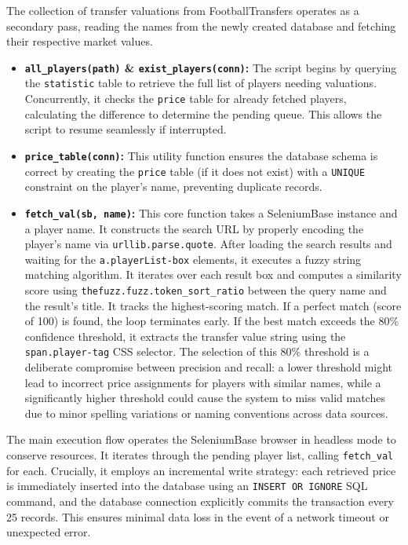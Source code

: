 \documentclass[a4paper,12pt]{report}
\begin{document}
The collection of transfer valuations from FootballTransfers operates as a secondary pass, reading the names from the newly created database and fetching their respective market values.

\begin{itemize}
    \item \textbf{\texttt{all\_players(path)} \& \texttt{exist\_players(conn)}:} The script begins by querying the \texttt{statistic} table to retrieve the full list of players needing valuations. Concurrently, it checks the \texttt{price} table for already fetched players, calculating the difference to determine the pending queue. This allows the script to resume seamlessly if interrupted.
    
    \item \textbf{\texttt{price\_table(conn)}:} This utility function ensures the database schema is correct by creating the \texttt{price} table (if it does not exist) with a \texttt{UNIQUE} constraint on the player's name, preventing duplicate records.
    
    \item \textbf{\texttt{fetch\_val(sb, name)}:} This core function takes a SeleniumBase instance and a player name. It constructs the search URL by properly encoding the player's name via \texttt{urllib.parse.quote}. After loading the search results and waiting for the \texttt{a.playerList-box} elements, it executes a fuzzy string matching algorithm. It iterates over each result box and computes a similarity score using \texttt{thefuzz.fuzz.token\_sort\_ratio} between the query name and the result's title. It tracks the highest-scoring match. If a perfect match (score of 100) is found, the loop terminates early. If the best match exceeds the 80\% confidence threshold, it extracts the transfer value string using the \texttt{span.player-tag} CSS selector. The selection of this 80\% threshold is a deliberate compromise between precision and recall: a lower threshold might lead to incorrect price assignments for players with similar names, while a significantly higher threshold could cause the system to miss valid matches due to minor spelling variations or naming conventions across data sources.
\end{itemize}

The main execution flow operates the SeleniumBase browser in headless mode to conserve resources. It iterates through the pending player list, calling \texttt{fetch\_val} for each. Crucially, it employs an incremental write strategy: each retrieved price is immediately inserted into the database using an \texttt{INSERT OR IGNORE} SQL command, and the database connection explicitly commits the transaction every 25 records. This ensures minimal data loss in the event of a network timeout or unexpected error.
\end{document}
